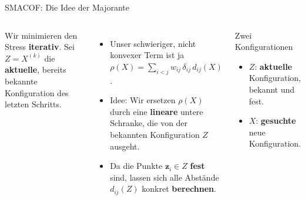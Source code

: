 \begin{frame}{SMACOF: Die Idee der Majorante}
\footnotesize
\begin{columns}
Wir minimieren den Stress \textbf{iterativ}. Sei $Z = X^{(k)}$ die
\textbf{aktuelle}, bereits bekannte Konfiguration des letzten Schritts.

\vspace{0.4em}
\begin{itemize}
  \item Unser schwieriger, nicht konvexer Term ist ja 
        $\rho(X) = \sum_{i<j} w_{ij}\,\delta_{ij}\,d_{ij}(X)$.
  \item Idee: Wir ersetzen $\rho(X)$ durch eine \textbf{lineare} untere
        Schranke, die von der bekannten Konfiguration $Z$ ausgeht.
  \item Da die Punkte $\mathbf{z}_i \in Z$ \textbf{fest} sind, lassen sich
        alle Abstände $d_{ij}(Z)$ konkret \textbf{berechnen}.
\end{itemize}

\begin{blockC3}{\footnotesize Zwei Konfigurationen}
\begin{itemize}
  \item $Z$: \textbf{aktuelle} Konfiguration, bekannt und fest.
  \item $X$: \textbf{gesuchte} neue Konfiguration.
\end{itemize}
\end{blockC3}
\end{columns}
\end{frame}

